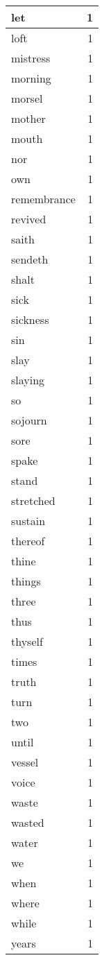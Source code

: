 \begin{center}
\begin{longtable}{l|r}
let & 1 \\ \hline
loft & 1 \\ \hline
mistress & 1 \\ \hline
morning & 1 \\ \hline
morsel & 1 \\ \hline
mother & 1 \\ \hline
mouth & 1 \\ \hline
nor & 1 \\ \hline
own & 1 \\ \hline
remembrance & 1 \\ \hline
revived & 1 \\ \hline
saith & 1 \\ \hline
sendeth & 1 \\ \hline
shalt & 1 \\ \hline
sick & 1 \\ \hline
sickness & 1 \\ \hline
sin & 1 \\ \hline
slay & 1 \\ \hline
slaying & 1 \\ \hline
so & 1 \\ \hline
sojourn & 1 \\ \hline
sore & 1 \\ \hline
spake & 1 \\ \hline
stand & 1 \\ \hline
stretched & 1 \\ \hline
sustain & 1 \\ \hline
thereof & 1 \\ \hline
thine & 1 \\ \hline
things & 1 \\ \hline
three & 1 \\ \hline
thus & 1 \\ \hline
thyself & 1 \\ \hline
times & 1 \\ \hline
truth & 1 \\ \hline
turn & 1 \\ \hline
two & 1 \\ \hline
until & 1 \\ \hline
vessel & 1 \\ \hline
voice & 1 \\ \hline
waste & 1 \\ \hline
wasted & 1 \\ \hline
water & 1 \\ \hline
we & 1 \\ \hline
when & 1 \\ \hline
where & 1 \\ \hline
while & 1 \\ \hline
years & 1 \\ \hline
\end{longtable}
\end{center}




